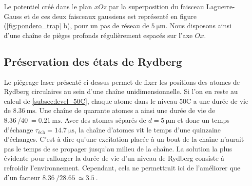 Le potentiel créé dans le plan $xOz$ par la superposition du faisceau Laguerre-Gauss et de ces deux faisceaux gaussiens est représenté en figure (\ref{fig:pondero_trap} b), pour un pas de réseau de $\SI{5}{\um}$.
Nous disposons ainsi d'une chaîne de pièges profonds régulièrement espacés sur l'axe $Ox$.

	
	\subsection{Préservation des états de Rydberg}\label{subsec:inhibition}
\noindent Le piégeage laser présenté ci-dessus permet de fixer les positions des atomes de Rydberg circulaires au sein d'une chaîne unidimensionnelle.
Si l'on en reste au calcul de \ref{subsec:level_50C}, chaque atome dans le niveau $\mathrm{50C}$ a une durée de vie de $\SI{8.36}{\ms}$.
Une chaîne de quarante atomes a ainsi une durée de vie de $\SI{8.36}{}/\SI{40}{} = \SI{0.21}{\ms}$.
Avec des atomes séparés de $d=\SI{5}{\um}$ et donc un temps d'échange $\tau_{\text{éch}} = \SI{14.7}{\us}$, la chaîne d'atomes vit le temps d'une quinzaine d'échanges.
C'est-à-dire qu'une excitation placée à un bout de la chaîne n'aurait pas le temps de se propager jusqu'au milieu de la chaîne.
La solution la plus évidente pour rallonger la durée de vie d'un niveau de Rydberg consiste à refroidir l'environnement.
Cependant, cela ne permettrait ici de l'améliorer que d'un facteur $\SI{8.36}{}/\SI{28.65}{} \simeq \SI{3.5}{}$.

